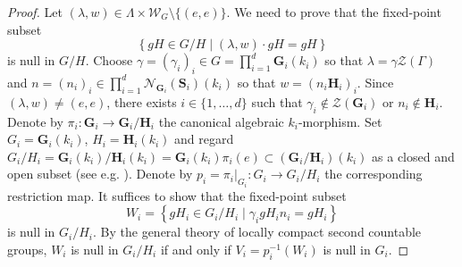\documentclass[11pt]{amsart}
\numberwithin{equation}{section}
\theoremstyle{plain}
\theoremstyle{definition}
\begin{document}
\begin{proof}
Let $(\lambda, w) \in \Lambda \times \mathscr W_G \setminus \{(e, e)\}$. We need to prove that the fixed-point subset $$\left \{gH \in G/H \mid (\lambda, w) \cdot gH = gH \right \}$$ is null in $G/H$. Choose $\gamma = (\gamma_i)_i \in G = \prod_{i = 1}^d \mathbf G_i(k_i)$ so that $\lambda = \gamma \mathscr Z(\Gamma)$ and $n = (n_i)_i \in \prod_{i = 1}^d \mathscr N_{\mathbf G_i}(\mathbf S_i)(k_i)$ so that $w = (n_i \mathbf H_i)_i$. Since $(\lambda, w) \neq (e, e)$, there exists $i \in \{1, \dots, d\}$ such that $\gamma_i \notin \mathscr Z(\mathbf G_i)$ or $n_i \notin \mathbf H_i$. Denote by $\pi_i : \mathbf G_i \to \mathbf G_i/\mathbf H_i$ the canonical algebraic $k_i$-morphism. Set $G_i = \mathbf G_i(k_i)$, $H_i = \mathbf H_i(k_i)$ and regard $G_i/H_i = \mathbf G_i(k_i)/\mathbf H_i(k_i) = \mathbf G_i(k_i) \pi_i(e) \subset (\mathbf G_i/\mathbf H_i)(k_i)$ as a closed and open subset (see e.g.\! \cite[Proposition I.2.1.4]{Ma91}). Denote by $p_i = {\pi_i}|_{G_i} : G_i \to G_i/H_i$ the corresponding restriction map. It suffices to show that the fixed-point subset 
$$W_i = \left \{gH_i \in G_i/H_i \mid \gamma_i gH_i n_i = gH_i \right \}$$ 
is null in $G_i/H_i$. By the general theory of locally compact second countable groups, $W_i$ is null in $G_i/H_i$ if and only if $V_i = p_i^{-1}(W_i)$ is null in $G_i$.


\end{proof}
\end{document}

